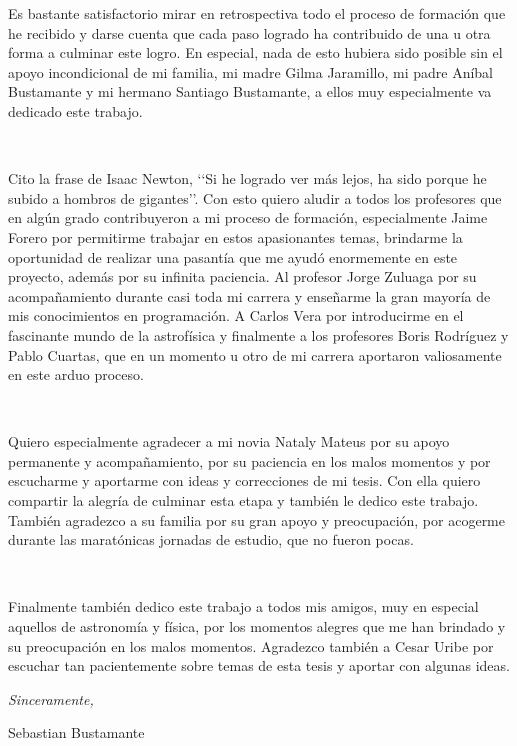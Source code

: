 \begin{acknowledgements}      

Es bastante satisfactorio mirar en retrospectiva todo el proceso de 
formación que he recibido y darse cuenta que cada paso logrado ha contribuido 
de una u otra forma a culminar este logro. En especial, nada de esto hubiera 
sido posible sin el apoyo incondicional de mi familia, mi madre Gilma 
Jaramillo, mi padre Aníbal Bustamante y mi hermano Santiago Bustamante, a 
ellos muy especialmente va dedicado este trabajo.

\

Cito la frase de Isaac Newton, ‘‘Si he logrado ver más lejos, ha sido 
porque he subido a hombros de gigantes’’. Con esto quiero aludir a todos los 
profesores que en algún grado contribuyeron a mi proceso de formación,
especialmente Jaime Forero por permitirme trabajar en estos apasionantes temas,
brindarme la oportunidad de realizar una pasantía que me ayudó enormemente
en este proyecto, además por su infinita paciencia. Al profesor Jorge Zuluaga 
por su acompañamiento durante casi toda mi carrera y enseñarme la gran mayoría
de mis conocimientos en programación. A Carlos Vera por introducirme en el 
fascinante mundo de la astrofísica y finalmente a los profesores Boris
Rodríguez y Pablo Cuartas, que en un momento u otro de mi carrera aportaron 
valiosamente en este arduo proceso.

\

Quiero especialmente agradecer a mi novia Nataly Mateus por su apoyo 
permanente y acompañamiento, por su paciencia en los malos momentos y por 
escucharme y aportarme con ideas y correcciones de mi tesis. Con ella quiero 
compartir la alegría de culminar esta etapa y también le dedico este trabajo. 
También agradezco a su familia por su gran apoyo y preocupación, por acogerme 
durante las maratónicas jornadas de estudio, que no fueron pocas.

\

Finalmente también dedico este trabajo a todos mis amigos, muy en especial 
aquellos de astronomía y física, por los momentos alegres que me han brindado
y su preocupación en los malos momentos. Agradezco también a Cesar Uribe 
por escuchar tan pacientemente sobre temas de esta tesis y aportar 
con algunas ideas.


\begin{flushright}
\textit{Sinceramente,}


Sebastian Bustamante


\monthname \ \the\year
\end{flushright}


\end{acknowledgements}

